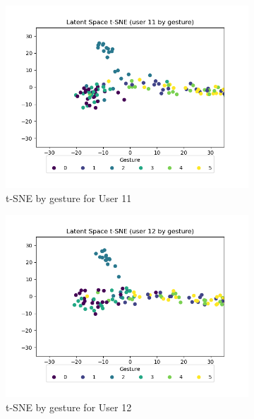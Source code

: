 \begin{figure}[b]
\begin{subfigure}{0.3\textwidth}
		\includegraphics[width=\textwidth]{figures/short/short_ls_u11}
		\caption{t-SNE by gesture for User 11}
	\end{subfigure}
	\hfill
	\begin{subfigure}{0.3\textwidth}
		\centering
		\includegraphics[width=\textwidth]{figures/short/short_ls_u12}
		\caption{t-SNE by gesture for User 12}
	\end{subfigure}
	\hfill
	\begin{subfigure}{0.3\textwidth}
		\centering

\end{subfigure}
\end{figure}
